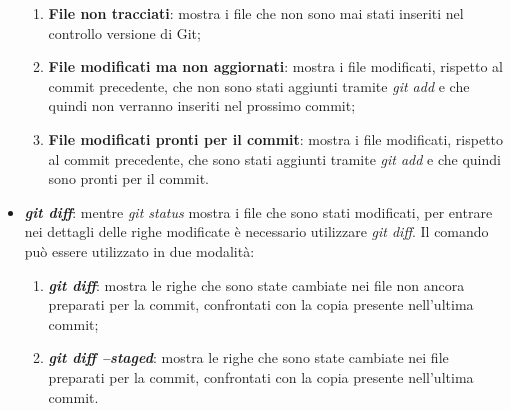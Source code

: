 \begin{itemize}
                            \begin{enumerate}
                                \item \textbf{File non tracciati}: mostra i file che non sono mai stati inseriti
                                nel controllo versione di Git;
                                \item \textbf{File modificati ma non aggiornati}: mostra i file modificati,
                                rispetto al commit precedente, che non sono stati aggiunti tramite
                                \textit{git add} e che quindi non verranno inseriti nel prossimo commit;
                                \item \textbf{File modificati pronti per il commit}: mostra i file modificati,
                                rispetto al commit precedente, che sono stati aggiunti tramite \textit{git add}
                                e che quindi sono pronti per il commit.
                            \end{enumerate}

                        \item \textbf{\textit{git diff}}: mentre \textit{git status} mostra i file che sono stati
                        modificati, per entrare nei dettagli delle righe modificate è necessario
                        utilizzare \textit{git diff}.
                        Il comando può essere utilizzato in due modalità:

                            \begin{enumerate}
                                \item \textbf{\textit{git diff}}: mostra le righe che sono state cambiate nei
                                file non ancora preparati per la commit, confrontati con la copia
                                presente nell'ultima commit;
                                \item \textbf{\textit{git diff --staged}}: mostra le righe che sono state
                                cambiate nei file preparati per la commit, confrontati con la
                                copia presente nell'ultima commit.
                            \end{enumerate}


\end{itemize}
